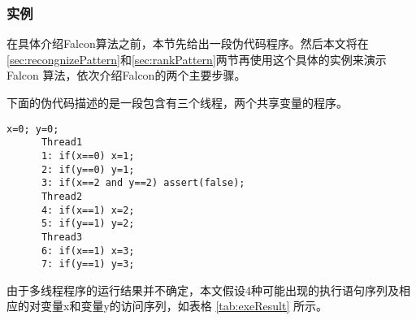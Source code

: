 \subsubsection{实例}\label{sec:Example}
在具体介绍Falcon算法之前，本节先给出一段伪代码程序。然后本文将在\ref{sec:recongnizePattern}和\ref{sec:rankPattern}两节再使用这个具体的实例来演示Falcon 算法，依次介绍Falcon的两个主要步骤。\par
下面的伪代码描述的是一段包含有三个线程，两个共享变量的程序。
\begin{lstlisting}[language={[AspectJ]Java}, label=lst:code, caption=示例伪代码]
      x=0; y=0;
      Thread1
      1: if(x==0) x=1;
      2: if(y==0) y=1;
      3: if(x==2 and y==2) assert(false);
      Thread2
      4: if(x==1) x=2;
      5: if(y==1) y=2;
      Thread3
      6: if(x==1) x=3;
      7: if(y==1) y=3;
\end{lstlisting}\par
由于多线程程序的运行结果并不确定，本文假设4种可能出现的执行语句序列及相应的对变量x和变量y的访问序列，如表格
\ref{tab:exeResult} 所示。
\begin{table}[!ht]
    \centering
\end{table}
